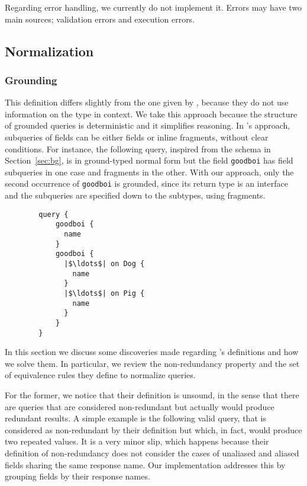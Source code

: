 Regarding error handling, we currently do not implement it. Errors may have two main sources; validation errors and execution errors.

\subsection{Normalization}

\subsubsection{Grounding}
This definition differs slightly from the one given by \HP{}, because they do not use information on the type in context. We take this approach because the structure of grounded queries is deterministic and it simplifies reasoning. In \HP{}'s approach, subqueries of fields can be either fields or inline fragments, without clear conditions. For instance, the following query, inspired from the schema in Section~\ref{sec:bg}, is in ground-typed normal form but the field \texttt{goodboi} has field subqueries in one case and fragments in the other. With our approach, only the second occurrence of \texttt{goodboi} is grounded, since its return type is an interface and the subqueries are specified down to the subtypes, using fragments.

\begin{verbatim}
        query {
            goodboi {
              name
            }
            goodboi {
              |$\ldots$| on Dog {
                name
              }
              |$\ldots$| on Pig {
                name
              }
            }
        }
\end{verbatim}


In this section we discuss some discoveries made regarding \HP{}'s definitions and how we solve them. In particular, we review the non-redundancy property and the set of equivalence rules they define to normalize queries.

For the former, we notice that their definition is unsound, in the sense that there are queries that are considered non-redundant but actually would produce redundant results. A simple example is the following valid query, that is considered as non-redundant by their definition but which, in fact, would produce two repeated values. It is a very minor slip, which happens because their definition of non-redundancy does not consider the cases of unaliased and aliased fields sharing the same response name. Our implementation addresses this by grouping fields by their response names.


